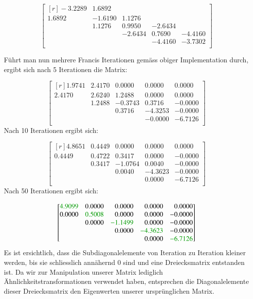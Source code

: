 \begin{equation}
\begin{bmatrix*}[r]
-3.2289 &	1.6892 &	 &	 &	\\
1.6892 &	-1.6190 & 1.1276 &  &	\\
 &	1.1276&	0.9950 &	-2.6434 &	\\
 &	 &	-2.6434 &	0.7690 &	-4.4160\\
 &	 &		& -4.4160 & -3.7302\\
\end{bmatrix*}
\end{equation}

Führt man nun mehrere Francis Iterationen gemäss obiger Implementation durch, ergibt sich nach 5 Iterationen die Matrix:

\begin{equation}
\begin{bmatrix*}[r]
1.9741 & 2.4170	& 0.0000 & 0.0000 & 0.0000\\
2.4170 & 2.6240 & 1.2488 & 0.0000 & 0.0000\\
 & 1.2488 & -0.3743 & 0.3716 & -0.0000\\
 &  & 0.3716 & -4.3253 & -0.0000\\
 &  &  &-0.0000 & -6.7126\\
\end{bmatrix*}
\end{equation}
Nach 10 Iterationen ergibt sich:

\begin{equation}
\begin{bmatrix*}[r]
4.8651 & 0.4449 & 0.0000 & 0.0000 & 0.0000\\
0.4449 & 0.4722 & 0.3417 & 0.0000 & -0.0000\\
 & 0.3417 &-1.0764 & 0.0040 & -0.0000\\
 &  & 0.0040 & -4.3623 & -0.0000\\
 &  &  & 0.0000 & -6.7126\\
\end{bmatrix*}
\end{equation}
Nach 50 Iterationen ergibt sich:

\begin{equation}
\begin{bmatrix*}[r]
\textcolor{darkgreen}{4.9099} & 0.0000	& 0.0000 & 0.0000 & 0.0000\\
0.0000 & \textcolor{darkgreen}{0.5008} & 0.0000 & 0.0000 & -0.0000\\
 & 0.0000 & \textcolor{darkgreen}{-1.1499} & 0.0000 & -0.0000\\
 &  & 0.0000 & \textcolor{darkgreen}{-4.3623} & -0.0000\\
 &  &  & 0.0000 &\textcolor{darkgreen}{-6.7126}\\
\end{bmatrix*}
\end{equation}
Es ist ersichtlich, dass die Subdiagonalelemente von Iteration zu Iteration kleiner werden, bis sie schliesslich annähernd 0 sind und eine Dreiecksmatrix entstanden ist.
Da wir zur Manipulation unserer Matrix lediglich Ähnlichkeitstransformationen verwendet haben, entsprechen die Diagonalelemente dieser Dreiecksmatrix den Eigenwerten unserer ursprünglichen Matrix.
